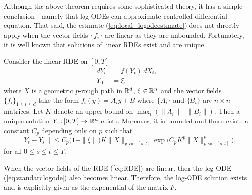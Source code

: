Although the above theorem requires some sophisticated theory, it has a simple conclusion - namely
that log-ODEs can approximate controlled differential equation. That said, the estimate (\ref{eq:local_logodeestimate}) does not directly apply when the vector fields $\{f_i\}$ are linear as they are unbounded. Fortunately, it is well known that solutions of linear RDEs exist and are unique.
\begin{theorem}\label{thm:linearexistance}
Consider the linear RDE on $[0,T]$
\begin{align*}
dY_t & = f(Y_t)\,dX_t,\\
Y_0 & = \xi,
\end{align*}
where $X$ is a geometric $p$-rough path in $\mathbb{R}^d$, $\xi\in\mathbb{R}^n$ and the vector fields $\{f_i\}_{1\leq i\leq d}$ take the form $f_i(y) = A_i y + B$ where $\{A_{i}\}$ and $\{B_i\}$ are $n\times n$ matrices. Let $K$ denote an upper bound on $\max_i (\|A_i\| + \|B_i\|)$. Then a unique solution $Y:[0,T]\rightarrow\mathbb{R}^n$ exists. Moreover, it is bounded and there exists a constant $C_p$ depending only on $p$ such that
\begin{equation}
\|Y_t - Y_s\| \leq C_p\big(1+\|\xi\|\big)K\|X\|_{p\text{-var};[s,t]}\exp\Big(C_p K^p \|X\|_{p\text{-var};[s,t]}^p\Big),
\label{eq:linearRDEbound}
\end{equation}
for all $0\leq s\leq t\leq T$.
\end{theorem}

When the vector fields of the RDE (\ref{eq:RDE}) are linear, then the log-ODE (\ref{eq:standardlogode}) also becomes linear. Therefore, the log-ODE solution exists and is explicitly given as the exponential of the matrix $F$.

